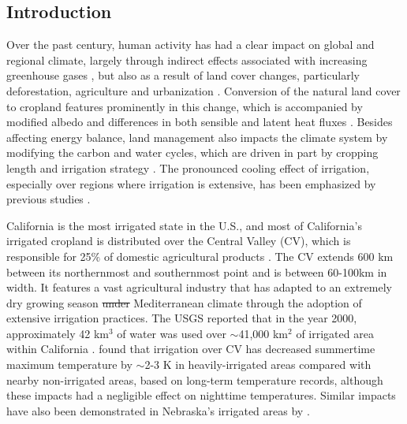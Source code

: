 \documentclass[draft,ms]{agutex}   %
\providecommand{\DIFadd}[1]{{\protect\color{blue}\uwave{#1}}} %
\providecommand{\DIFdel}[1]{{\protect\color{red}\sout{#1}}}                      %
\providecommand{\DIFaddbegin}{} %
\providecommand{\DIFaddend}{} %
\providecommand{\DIFdelbegin}{} %
\providecommand{\DIFdelend}{} %
\begin{document}
\begin{article}


%
\section{Introduction}

Over the past century, human activity has had a clear impact on global and regional climate, largely through indirect effects associated with increasing greenhouse gases \citep{solomon2007ipcc}, but also as a result of land cover changes, particularly deforestation, agriculture and urbanization \citep{bonan1997effects, pielke2002influence, kueppers2008seasonal}. Conversion of the natural land cover to cropland features prominently in this change, which is accompanied by modified albedo and differences in both sensible and latent heat fluxes \citep{foley2003green}. Besides affecting energy balance, land management also impacts the climate system by modifying the carbon and water cycles, which are driven in part by cropping length and irrigation strategy \citep{lobell2006biogeophysical}. The pronounced cooling effect of irrigation, especially over regions where irrigation is extensive, has been emphasized by previous studies \citep{kueppers2007irrigation, lobell2008effect}.

California is the most irrigated state in the U.S., and most of California's irrigated cropland is distributed over the Central Valley (CV), which is responsible for 25$\%$ of domestic agricultural products \citep{wilkinson2002preparing}. The CV extends 600 km between its northernmost and southernmost point and is between 60-100km in width.  It features a vast agricultural industry that has adapted to an extremely dry growing season \DIFdelbegin \DIFdel{under }\DIFdelend \DIFaddbegin \DIFadd{with a }\DIFaddend Mediterranean climate through the adoption of extensive irrigation practices. The USGS reported that in the year 2000, approximately 42 km$^3$ of water was used over $\sim$41,000 km$^2$ of irrigated area within California \citep{doll2002global, famiglietti2011satellites}. \cite{bonfils2007empirical} found that irrigation over CV has decreased summertime maximum temperature by $\sim$2-3 K in heavily-irrigated areas compared with nearby non-irrigated areas, based on long-term temperature records, although these impacts had a negligible effect on nighttime temperatures. Similar impacts have also been demonstrated in Nebraska's irrigated areas by \citet{mahmood2006impacts}.


\end{article}
\end{document}
